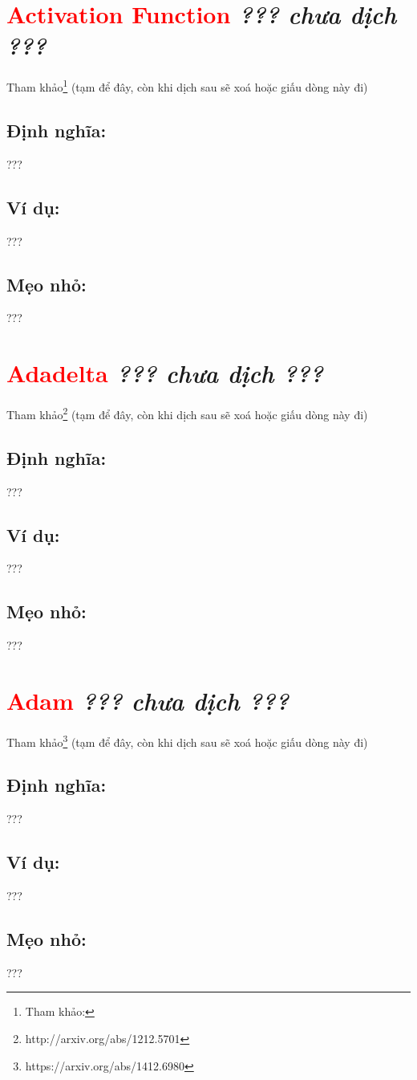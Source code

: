\section*{\huge \textcolor{Red}{Activation Function}  \small \textit{??? chưa dịch ???} }
Tham khảo\footnote{Tham khảo:} (tạm để đây, còn khi dịch sau sẽ xoá hoặc giấu dòng này đi)
\subsection*{Định nghĩa:}
???
\subsection*{Ví dụ:}
???
\subsection*{Mẹo nhỏ:}
???
\section*{\huge \textcolor{Red}{Adadelta}  \small \textit{??? chưa dịch ???} }
Tham khảo\footnote{http://arxiv.org/abs/1212.5701 } (tạm để đây, còn khi dịch sau sẽ xoá hoặc giấu dòng này đi)
\subsection*{Định nghĩa:}
???
\subsection*{Ví dụ:}
???
\subsection*{Mẹo nhỏ:}
???
\section*{\huge \textcolor{Red}{Adam}  \small \textit{??? chưa dịch ???} }
Tham khảo\footnote{https://arxiv.org/abs/1412.6980} (tạm để đây, còn khi dịch sau sẽ xoá hoặc giấu dòng này đi)
\subsection*{Định nghĩa:}
???
\subsection*{Ví dụ:}
???
\subsection*{Mẹo nhỏ:}
???
